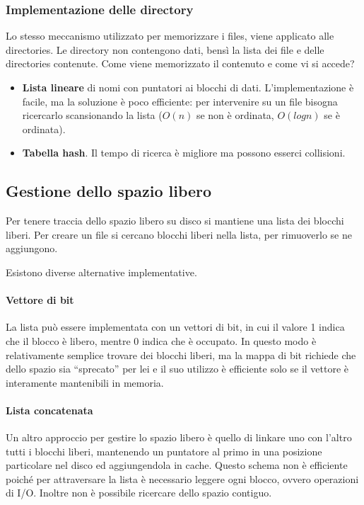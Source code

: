 \documentclass[a4paper]{article}
\begin{document}
\subsubsection{Implementazione delle directory}
Lo stesso meccanismo utilizzato per memorizzare i files, viene applicato alle directories. Le directory non contengono dati, bensì la lista dei file e delle directories contenute. Come viene memorizzato il contenuto e come vi si accede?
\begin{itemize}
    \item \textbf{Lista lineare} di nomi con puntatori ai blocchi di dati. L'implementazione è facile, ma la soluzione è poco efficiente: per intervenire su un file bisogna ricercarlo scansionando la lista ($O(n)$ se non è ordinata, $O(log n)$ se è ordinata).
    \item \textbf{Tabella hash}. Il tempo di ricerca è migliore ma possono esserci collisioni.
\end{itemize}

\subsection{Gestione dello spazio libero}

Per tenere traccia dello spazio libero su disco si mantiene una lista dei blocchi liberi. Per creare un file si cercano blocchi liberi nella lista, per rimuoverlo se ne aggiungono.

Esistono diverse alternative implementative.

\paragraph{Vettore di bit}
La lista può essere implementata con un vettori di bit, in cui il valore 1 indica che il blocco è libero, mentre 0 indica che è occupato. In questo modo è relativamente semplice trovare dei blocchi liberi, ma la mappa di bit richiede che dello spazio sia ``sprecato'' per lei e il suo utilizzo è efficiente solo se il vettore è interamente mantenibili in memoria.

\paragraph{Lista concatenata}
Un altro approccio per gestire lo spazio libero è quello di linkare uno con l'altro tutti i blocchi liberi, mantenendo un puntatore al primo in una posizione particolare nel disco ed aggiungendola in cache. Questo schema non è efficiente poiché per attraversare la lista è necessario leggere ogni blocco, ovvero operazioni di I/O. Inoltre non è possibile ricercare dello spazio contiguo.
\end{document}
